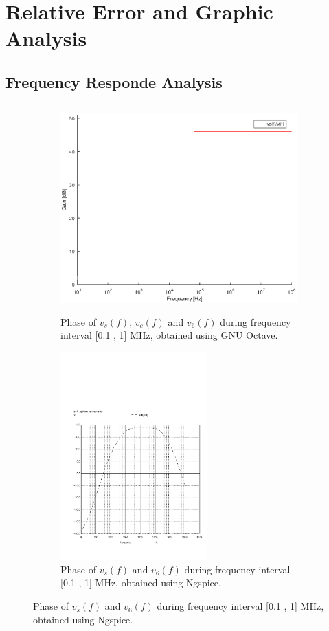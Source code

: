\section{Relative Error and Graphic Analysis}
\label{sec:erroranalysis}

\subsection{Frequency Responde Analysis}
\label{subsec:freqresp}

\begin{figure}[H]

\begin{subfigure}{0.5\textwidth}
\includegraphics[width=0.9\linewidth, height=8cm]{gain.eps} 
\caption{Phase of $v_s(f)$,  $v_c(f)$  and $v_6(f)$ during frequency interval [0.1 , 1] MHz, obtained using GNU Octave.}
\label{fig:theo_third}
\end{subfigure}
\begin{subfigure}{0.5\textwidth}
\includegraphics[width=0.8\linewidth, height=8cm]{vo2f.pdf}
\caption{Phase of $v_s(f)$ and $v_6(f)$ during frequency interval [0.1 , 1] MHz, obtained using Ngspice.}
\label{fig:total}
\end{subfigure}
\end{figure}

